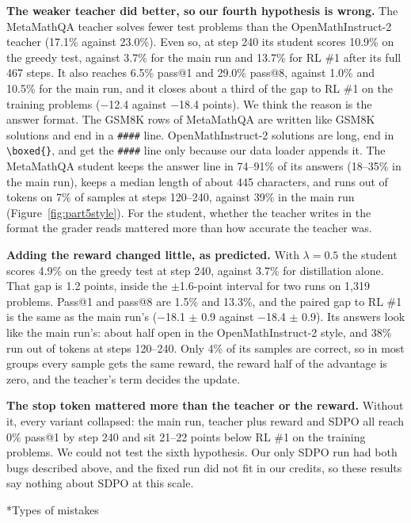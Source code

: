 \documentclass[11pt]{article}
\makeatletter
\renewcommand\subsection{\@startsection{subsection}{2}{\z@}{0.6em}{0.2em}{\normalsize\bfseries}}
\newcommand{\code}[1]{\texttt{#1}}
\makeatother
\begin{document}
\textbf{The weaker teacher did better, so our fourth hypothesis is wrong.} The MetaMathQA teacher solves fewer test problems than the OpenMathInstruct-2 teacher (17.1\% against 23.0\%). Even so, at step 240 its student scores 10.9\% on the greedy test, against 3.7\% for the main run and 13.7\% for RL \#1 after its full 467 steps. It also reaches 6.5\% pass@1 and 29.0\% pass@8, against 1.0\% and 10.5\% for the main run, and it closes about a third of the gap to RL \#1 on the training problems ($-$12.4 against $-$18.4 points). We think the reason is the answer format. The GSM8K rows of MetaMathQA are written like GSM8K solutions and end in a \code{\#\#\#\#} line. OpenMathInstruct-2 solutions are long, end in \code{\textbackslash boxed\{\}}, and get the \code{\#\#\#\#} line only because our data loader appends it. The MetaMathQA student keeps the answer line in 74--91\% of its answers (18--35\% in the main run), keeps a median length of about 445 characters, and runs out of tokens on 7\% of samples at steps 120--240, against 39\% in the main run (Figure~\ref{fig:part5style}). For the student, whether the teacher writes in the format the grader reads mattered more than how accurate the teacher was.

\textbf{Adding the reward changed little, as predicted.} With $\lambda = 0.5$ the student scores 4.9\% on the greedy test at step 240, against 3.7\% for distillation alone. That gap is 1.2 points, inside the $\pm$1.6-point interval for two runs on 1,319 problems. Pass@1 and pass@8 are 1.5\% and 13.3\%, and the paired gap to RL \#1 is the same as the main run's ($-$18.1 $\pm$ 0.9 against $-$18.4 $\pm$ 0.9). Its answers look like the main run's: about half open in the OpenMathInstruct-2 style, and 38\% run out of tokens at steps 120--240. Only 4\% of its samples are correct, so in most groups every sample gets the same reward, the reward half of the advantage is zero, and the teacher's term decides the update.

\textbf{The stop token mattered more than the teacher or the reward.} Without it, every variant collapsed: the main run, teacher plus reward and SDPO all reach 0\% pass@1 by step 240 and sit 21--22 points below RL \#1 on the training problems. We could not test the sixth hypothesis. Our only SDPO run had both bugs described above, and the fixed run did not fit in our credits, so these results say nothing about SDPO at this scale.

\subsection*{Types of mistakes}
\end{document}
